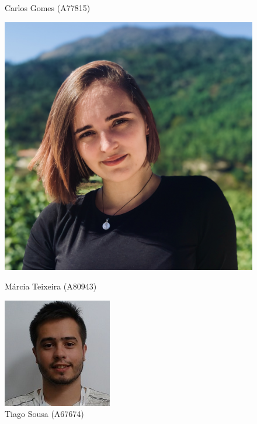 \documentclass[a4paper]{report}
\begin{document}
\begin{figure}[H]
\begin{minipage}[b]{0.2\textwidth}
    \caption*{Carlos Gomes (A77815)}
  \end{minipage}
  \hfill
  \begin{minipage}[b]{0.2\textwidth}
    \centering
    \includegraphics[width=\textwidth]{images/marcia.png}
    \caption*{Márcia Teixeira (A80943)}
  \end{minipage}
  \hfill
  \begin{minipage}[b]{0.2\textwidth}
    \centering
    \includegraphics[width=\textwidth]{images/tiago.jpg}
    \caption*{Tiago Sousa (A67674)}
  \end{minipage}
  
\end{figure}
\end{document}
